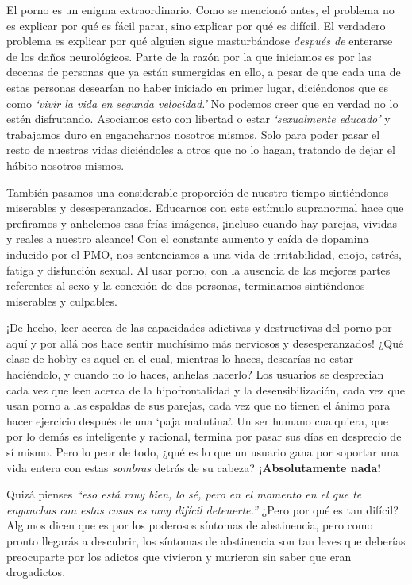 \documentclass[
  spanish,
  openany]{book}
\begin{document}
El porno es un enigma extraordinario. Como se mencionó antes, el problema no es explicar por qué es fácil parar, sino explicar por qué es difícil. El verdadero problema es explicar por qué alguien sigue masturbándose \emph{después de} enterarse de los daños neurológicos. Parte de la razón por la que iniciamos es por las decenas de personas que ya están sumergidas en ello, a pesar de que cada una de estas personas desearían no haber iniciado en primer lugar, diciéndonos que es como \emph{`vivir la vida en segunda velocidad.'} No podemos creer que en verdad no lo estén disfrutando. Asociamos esto con libertad o estar \emph{`sexualmente educado'} y trabajamos duro en engancharnos nosotros mismos. Solo para poder pasar el resto de nuestras vidas diciéndoles a otros que no lo hagan, tratando de dejar el hábito nosotros mismos.

También pasamos una considerable proporción de nuestro tiempo sintiéndonos miserables y desesperanzados. Educarnos con este estímulo supranormal hace que prefiramos y anhelemos esas frías imágenes, ¡incluso cuando hay parejas, vividas y reales a nuestro alcance! Con el constante aumento y caída de dopamina inducido por el PMO, nos sentenciamos a una vida de irritabilidad, enojo, estrés, fatiga y disfunción sexual. Al usar porno, con la ausencia de las mejores partes referentes al sexo y la conexión de dos personas, terminamos sintiéndonos miserables y culpables.

¡De hecho, leer acerca de las capacidades adictivas y destructivas del porno por aquí y por allá nos hace sentir muchísimo más nerviosos y desesperanzados! ¿Qué clase de hobby es aquel en el cual, mientras lo haces, desearías no estar haciéndolo, y cuando no lo haces, anhelas hacerlo? Los usuarios se desprecian cada vez que leen acerca de la hipofrontalidad y la desensibilización, cada vez que usan porno a las espaldas de sus parejas, cada vez que no tienen el ánimo para hacer ejercicio después de una `paja matutina'. Un ser humano cualquiera, que por lo demás es inteligente y racional, termina por pasar sus días en desprecio de sí mismo. Pero lo peor de todo, ¿qué es lo que un usuario gana por soportar una vida entera con estas \emph{sombras} detrás de su cabeza? \textbf{¡Absolutamente nada!}

Quizá pienses \emph{``eso está muy bien, lo sé, pero en el momento en el que te enganchas con estas cosas es muy difícil detenerte.''} ¿Pero por qué es tan difícil? Algunos dicen que es por los poderosos síntomas de abstinencia, pero como pronto llegarás a descubrir, los síntomas de abstinencia son tan leves que deberías preocuparte por los adictos que vivieron y murieron sin saber que eran drogadictos.
\end{document}
